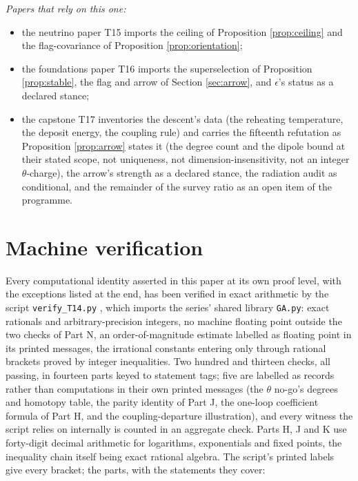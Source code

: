\documentclass[11pt]{article}
\theoremstyle{definition}
\let\oldsection\section
\renewcommand{\section}{\clearpage\oldsection}   %
\begin{document}
\emph{Papers that rely on this one:}
\begin{itemize}\setlength{\itemsep}{1pt}
\item the neutrino paper T15 \cite{ButlerT15} imports the ceiling of Proposition \ref{prop:ceiling} and the flag-covariance of Proposition \ref{prop:orientation};
\item the foundations paper T16 \cite{ButlerT16} imports the superselection of Proposition \ref{prop:stable}, the flag and arrow of Section \ref{sec:arrow}, and $\epsilon$'s status as a declared stance;
\item the capstone T17 \cite{ButlerT17} inventories the descent's data (the reheating temperature, the deposit energy, the coupling rule) and carries the fifteenth refutation as Proposition \ref{prop:arrow} states it (the degree count and the dipole bound at their stated scope, not uniqueness, not dimension-insensitivity, not an integer $\theta$-charge), the arrow's strength as a declared stance, the radiation audit as conditional, and the remainder of the survey ratio as an open item of the programme.
\end{itemize}

\section{Machine verification}\label{sec:verification}

Every computational identity asserted in this paper at its own proof level, with the exceptions listed at the end, has been verified in exact arithmetic by the script \texttt{verify\_T14.py} \cite{ButlerVerifyT14}, which imports the series' shared library \texttt{GA.py}: exact rationals and arbitrary-precision integers, no machine floating point outside the two checks of Part N, an order-of-magnitude estimate labelled as floating point in its printed messages, the irrational constants entering only through rational brackets proved by integer inequalities. Two hundred and thirteen checks, all passing, in fourteen parts keyed to statement tags; five are labelled as records rather than computations in their own printed messages (the $\theta$ no-go's degrees and homotopy table, the parity identity of Part J, the one-loop coefficient formula of Part H, and the coupling-departure illustration), and every witness the script relies on internally is counted in an aggregate check. Parts H, J and K use forty-digit decimal arithmetic for logarithms, exponentials and fixed points, the inequality chain itself being exact rational algebra. The script's printed labels give every bracket; the parts, with the statements they cover:
\end{document}
